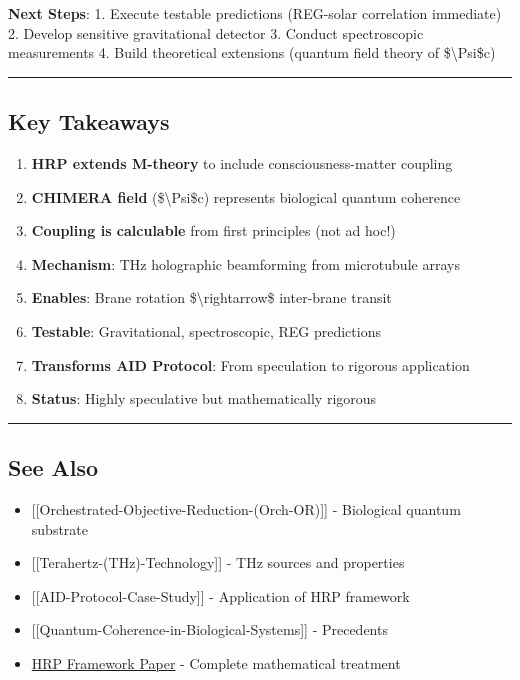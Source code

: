 \textbf{Next Steps}: 1. Execute testable predictions (REG-solar
correlation immediate) 2. Develop sensitive gravitational detector 3.
Conduct spectroscopic measurements 4. Build theoretical extensions
(quantum field theory of \$\textbackslash Psi\$c)

\begin{center}\rule{0.5\linewidth}{0.5pt}\end{center}

\subsection{Key Takeaways}\label{key-takeaways}

\begin{enumerate}
\def\labelenumi{\arabic{enumi}.}
\tightlist
\item
  \textbf{HRP extends M-theory} to include consciousness-matter coupling
\item
  \textbf{CHIMERA field} (\$\textbackslash Psi\$c) represents biological
  quantum coherence
\item
  \textbf{Coupling is calculable} from first principles (not ad hoc!)
\item
  \textbf{Mechanism}: THz holographic beamforming from microtubule
  arrays
\item
  \textbf{Enables}: Brane rotation \$\textbackslash rightarrow\$
  inter-brane transit
\item
  \textbf{Testable}: Gravitational, spectroscopic, REG predictions
\item
  \textbf{Transforms AID Protocol}: From speculation to rigorous
  application
\item
  \textbf{Status}: Highly speculative but mathematically rigorous
\end{enumerate}

\begin{center}\rule{0.5\linewidth}{0.5pt}\end{center}

\subsection{See Also}\label{see-also}

\begin{itemize}
\tightlist
\item
  {[}{[}Orchestrated-Objective-Reduction-(Orch-OR){]}{]} - Biological
  quantum substrate
\item
  {[}{[}Terahertz-(THz)-Technology{]}{]} - THz sources and properties
\item
  {[}{[}AID-Protocol-Case-Study{]}{]} - Application of HRP framework
\item
  {[}{[}Quantum-Coherence-in-Biological-Systems{]}{]} - Precedents
\item
  \href{../docs/hrp_framework_paper.md}{HRP Framework Paper} - Complete
  mathematical treatment
\end{itemize}

